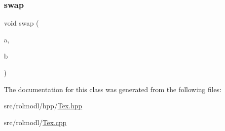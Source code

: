 \subsubsection{\texorpdfstring{swap}{swap}}
{\footnotesize\ttfamily void swap (\begin{DoxyParamCaption}\item[{\mbox{\hyperlink{classrolmodl_1_1texture_type_1_1_tex_lock}{Tex\+Lock}} \&}]{a,  }\item[{\mbox{\hyperlink{classrolmodl_1_1texture_type_1_1_tex_lock}{Tex\+Lock}} \&}]{b }\end{DoxyParamCaption})\hspace{0.3cm}{\ttfamily [friend]}}



The documentation for this class was generated from the following files\+:\begin{DoxyCompactItemize}
\item 
src/rolmodl/hpp/\mbox{\hyperlink{_tex_8hpp}{Tex.\+hpp}}\item 
src/rolmodl/\mbox{\hyperlink{_tex_8cpp}{Tex.\+cpp}}\end{DoxyCompactItemize}
